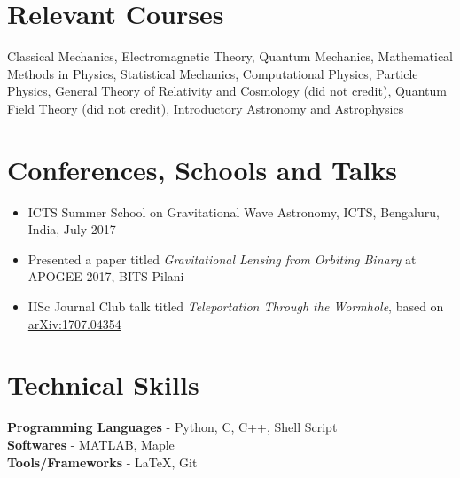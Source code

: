 \documentclass[margin, centered]{res}
\begin{document}
\begin{resume}
\section{Relevant \hspace{2mm} Courses}
Classical Mechanics, Electromagnetic Theory, Quantum Mechanics, Mathematical Methods in Physics, Statistical Mechanics, Computational Physics, Particle Physics, General Theory of Relativity and Cosmology (did not credit), Quantum Field Theory (did not credit), Introductory Astronomy and Astrophysics

\section{Conferences, Schools and Talks}
\begin{itemize}[leftmargin=*]
 \item ICTS Summer School on Gravitational Wave Astronomy, ICTS, Bengaluru, India, July 2017
 \item Presented a paper titled \textit{Gravitational Lensing from Orbiting Binary} at APOGEE 2017, BITS Pilani
 \item IISc Journal Club talk titled \textit{Teleportation Through the Wormhole}, based on \href{https://arxiv.org/abs/1707.04354}{arXiv:1707.04354}
 \end{itemize}
\section{Technical \hspace{2mm} Skills}
\textbf{Programming Languages} - Python, C, C++, Shell Script\\
\textbf{Softwares} - MATLAB, Maple \\
\textbf{Tools/Frameworks} - \LaTeX, Git



\end{resume}
\end{document}
